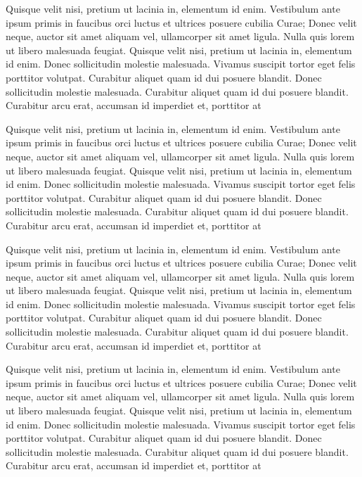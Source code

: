 \documentclass{scrbook}
\begin{document}
Quisque velit nisi, pretium ut lacinia in, elementum id enim. Vestibulum
ante ipsum primis in faucibus orci luctus et ultrices posuere cubilia
Curae; Donec velit neque, auctor sit amet aliquam vel, ullamcorper sit
amet ligula. Nulla quis lorem ut libero malesuada feugiat. Quisque velit
nisi, pretium ut lacinia in, elementum id enim. Donec sollicitudin
molestie malesuada. Vivamus suscipit tortor eget felis porttitor
volutpat. Curabitur aliquet quam id dui posuere blandit. Donec
sollicitudin molestie malesuada. Curabitur aliquet quam id dui posuere
blandit. Curabitur arcu erat, accumsan id imperdiet et, porttitor at

Quisque velit nisi, pretium ut lacinia in, elementum id enim. Vestibulum
ante ipsum primis in faucibus orci luctus et ultrices posuere cubilia
Curae; Donec velit neque, auctor sit amet aliquam vel, ullamcorper sit
amet ligula. Nulla quis lorem ut libero malesuada feugiat. Quisque velit
nisi, pretium ut lacinia in, elementum id enim. Donec sollicitudin
molestie malesuada. Vivamus suscipit tortor eget felis porttitor
volutpat. Curabitur aliquet quam id dui posuere blandit. Donec
sollicitudin molestie malesuada. Curabitur aliquet quam id dui posuere
blandit. Curabitur arcu erat, accumsan id imperdiet et, porttitor at

Quisque velit nisi, pretium ut lacinia in, elementum id enim. Vestibulum
ante ipsum primis in faucibus orci luctus et ultrices posuere cubilia
Curae; Donec velit neque, auctor sit amet aliquam vel, ullamcorper sit
amet ligula. Nulla quis lorem ut libero malesuada feugiat. Quisque velit
nisi, pretium ut lacinia in, elementum id enim. Donec sollicitudin
molestie malesuada. Vivamus suscipit tortor eget felis porttitor
volutpat. Curabitur aliquet quam id dui posuere blandit. Donec
sollicitudin molestie malesuada. Curabitur aliquet quam id dui posuere
blandit. Curabitur arcu erat, accumsan id imperdiet et, porttitor at

Quisque velit nisi, pretium ut lacinia in, elementum id enim. Vestibulum
ante ipsum primis in faucibus orci luctus et ultrices posuere cubilia
Curae; Donec velit neque, auctor sit amet aliquam vel, ullamcorper sit
amet ligula. Nulla quis lorem ut libero malesuada feugiat. Quisque velit
nisi, pretium ut lacinia in, elementum id enim. Donec sollicitudin
molestie malesuada. Vivamus suscipit tortor eget felis porttitor
volutpat. Curabitur aliquet quam id dui posuere blandit. Donec
sollicitudin molestie malesuada. Curabitur aliquet quam id dui posuere
blandit. Curabitur arcu erat, accumsan id imperdiet et, porttitor at
\end{document}
